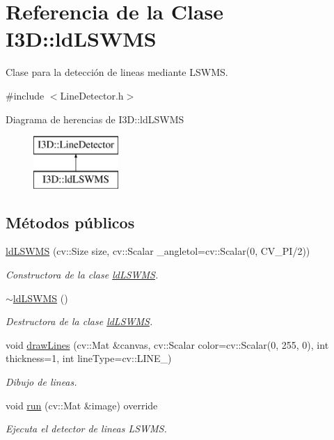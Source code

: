 \hypertarget{class_i3_d_1_1ld_l_s_w_m_s}{}\section{Referencia de la Clase I3D\+:\+:ld\+L\+S\+W\+MS}
\label{class_i3_d_1_1ld_l_s_w_m_s}


Clase para la detección de lineas mediante L\+S\+W\+MS.  




{\ttfamily \#include $<$Line\+Detector.\+h$>$}

Diagrama de herencias de I3D\+:\+:ld\+L\+S\+W\+MS\begin{figure}[H]
\begin{center}
\leavevmode
\includegraphics[height=2.000000cm]{class_i3_d_1_1ld_l_s_w_m_s}
\end{center}
\end{figure}
\subsection*{Métodos públicos}
\begin{DoxyCompactItemize}
\item 
\hyperlink{class_i3_d_1_1ld_l_s_w_m_s_a3de74908a087b8e6b0525a2f6c943568}{ld\+L\+S\+W\+MS} (cv\+::\+Size size, cv\+::\+Scalar \+\_\+angletol=cv\+::\+Scalar(0, C\+V\+\_\+\+PI/2))
\begin{DoxyCompactList}\small\item\em Constructora de la clase \hyperlink{class_i3_d_1_1ld_l_s_w_m_s}{ld\+L\+S\+W\+MS}. \end{DoxyCompactList}\item 
\hyperlink{class_i3_d_1_1ld_l_s_w_m_s_a0d98071e0e8b797670a79bfd77e8d6d5}{$\sim$ld\+L\+S\+W\+MS} ()
\begin{DoxyCompactList}\small\item\em Destructora de la clase \hyperlink{class_i3_d_1_1ld_l_s_w_m_s}{ld\+L\+S\+W\+MS}. \end{DoxyCompactList}\item 
void \hyperlink{class_i3_d_1_1ld_l_s_w_m_s_afe64627e711a33cf37bd4d8b2430c3a1}{draw\+Lines} (cv\+::\+Mat \&canvas, cv\+::\+Scalar color=cv\+::\+Scalar(0, 255, 0), int thickness=1, int line\+Type=cv\+::\+L\+I\+N\+E\+\_)
\begin{DoxyCompactList}\small\item\em Dibujo de lineas. \end{DoxyCompactList}\item 
void \hyperlink{class_i3_d_1_1ld_l_s_w_m_s_ab32e51dd8ef06da0f707ec2a51919660}{run} (cv\+::\+Mat \&image) override
\begin{DoxyCompactList}\small\item\em Ejecuta el detector de lineas L\+S\+W\+MS. \end{DoxyCompactList}\end{DoxyCompactItemize}
